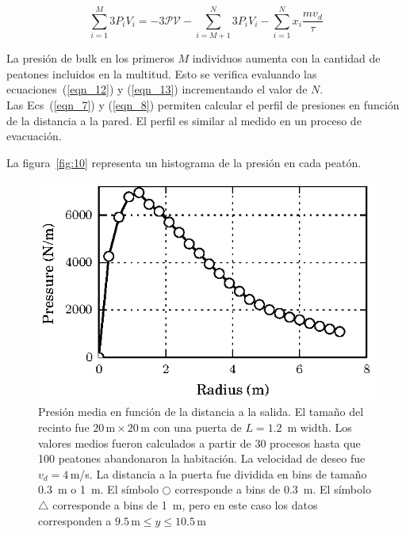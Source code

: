\begin{equation}
 \displaystyle\sum_{i=1}^M 3P_iV_i 
=-3\mathcal{PV}-\displaystyle\sum_{i=M+1}^N 3P_iV_i-\displaystyle\sum_{i=1}^N 
x_i\displaystyle\frac{mv_d}{\tau}\label{eqn_13}
\end{equation}

La presión de bulk en los primeros $M$ individuos aumenta con la cantidad de peatones incluidos en la multitud. Esto se verifica evaluando las ecuaciones~(\ref{eqn_12}) y (\ref{eqn_13}) incrementando el valor de $N$.\\

Las Ecs~(\ref{eqn_7}) y (\ref{eqn_8}) permiten calcular el perfil de presiones en función de la distancia a la pared. El perfil es similar al medido en un proceso de evacuación.

La figura~\ref{fig:10} representa un histograma de la presión en cada peatón. \\

\begin{figure}[H]
    \centering
    \includegraphics[scale=0.8]{figuras/p_dist.eps}
    \caption[width=5cm]{Presión media en función de la distancia a la salida. El tamaño del recinto fue $20\,\mathrm{m}\times20\,\mathrm{m}$  con una puerta de $L=1.2$~m width. Los valores medios fueron calculados a partir de 30 procesos hasta que 100 peatones abandonaron la habitación. La velocidad de deseo fue $v_d=4\,$m/s. La distancia a la puerta fue dividida en bins de tamaño $0.3$~m o 1~m.  El símbolo $\bigcirc$  corresponde a bins de $0.3$~m. El símbolo $\bigtriangleup$ corresponde a bins de 1~m, pero en este caso los datos corresponden a  $9.5\,\mathrm{m}\leq y\leq 10.5\,\mathrm{m}$ }
    \label{fis_g}
\end{figure}



